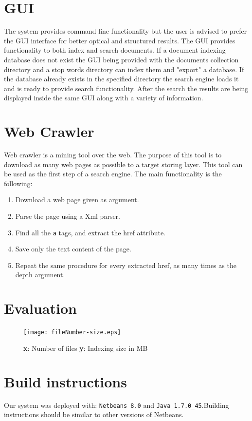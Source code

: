 \documentclass[letterpaper,10pt]{article}
\begin{document}
\section{GUI}
The system provides command line functionality but the user is advised to prefer the GUI interface for better optical and structured results. The GUI provides functionality to both index and search documents. If a document indexing database does not exist the GUI being provided with the documents collection directory and a stop words directory can index them and "export" a database. If the database already exists in the specified directory the search engine loads it and is ready to provide search functionality. After the search the results are being displayed inside the same GUI along with a variety of information.

\section{Web Crawler}
Web crawler is a mining tool over the web. The purpose of this tool is to download as many web pages as possible to a target storing layer. This tool can be used as the first step of a search engine. The main functionality is the following:
\begin{enumerate}
  \item Download a web page given as argument.
  \item Parse the page using a Xml parser.
  \item Find all the {\tt a} tags, and extract the href attribute.
  \item Save only the text content of the page.
  \item Repeat the same procedure for every extracted href, as many times as the depth argument.
\end{enumerate}

\section{Evaluation}

\begin{figure}[H]
    \centering
    \texttt{[image: fileNumber-size.eps]}
    \caption{ {\bf x}: Number of files {\bf y}: Indexing size in MB }
    \label{Query structure}
\end{figure}






\section{Build instructions}
Our system was deployed with: {\tt Netbeans 8.0} and {\tt Java 1.7.0\_45}.Building instructions should be similar to other versions of Netbeans.
\end{document}
